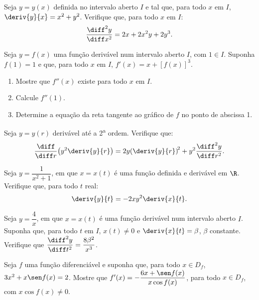 \begin{exercicio}[22]
\label{ex:7.11.22}
Seja $y = y(x)$ definida no intervalo aberto $I$ e tal que, para todo $x$ em $I$, $\deriv{y}{x} = x^2 + y^2$. Verifique que, para todo $x$ em $I$:
\[
\frac{\diff^2 y}{\diff x^2} = 2x + 2x^2 y + 2y^3.
\]
\end{exercicio}

\begin{exercicio}[23]
\label{ex:7.11.23}
Seja $y = f(x)$ uma função derivável num intervalo aberto $I$, com $1 \in I$. Suponha $f(1) = 1$ e que, para todo $x$ em $I$, $f'(x) = x + [f(x)]^3$.
\begin{enumerate}[label=\alph*)]
    \item Mostre que $f''(x)$ existe para todo $x$ em $I$.
    \item Calcule $f''(1)$.
    \item Determine a equação da reta tangente ao gráfico de $f$ no ponto de abscissa 1.
\end{enumerate}
\end{exercicio}

\begin{exercicio}[24]
\label{ex:7.11.24}
Seja $y = y(r)$ derivável até a 2\textsuperscript{a} ordem. Verifique que:
\[
\frac{\diff}{\diff r}\!\left(y^2 \deriv{y}{r}\right) = 2y\!\left(\deriv{y}{r}\right)^{\!2} + y^2 \frac{\diff^2 y}{\diff r^2}.
\]
\end{exercicio}

\begin{exercicio}[25]
\label{ex:7.11.25}
Seja $y = \dfrac{1}{x^2 + 1}$, em que $x = x(t)$ é uma função definida e derivável em $\R$. Verifique que, para todo $t$ real:
\[
\deriv{y}{t} = -2xy^2 \deriv{x}{t}.
\]
\end{exercicio}

\begin{exercicio}[26]
\label{ex:7.11.26}
Seja $y = \dfrac{4}{x}$, em que $x = x(t)$ é uma função derivável num intervalo aberto $I$. Suponha que, para todo $t$ em $I$, $x(t) \neq 0$ e $\deriv{x}{t} = \beta$, $\beta$ constante. Verifique que $\dfrac{\diff^2 y}{\diff t^2} = \dfrac{8\beta^2}{x^3}$.
\end{exercicio}

\begin{exercicio}[27]
\label{ex:7.11.27}
Seja $f$ uma função diferenciável e suponha que, para todo $x \in D_f$, $3x^2 + x\sen f(x) = 2$. Mostre que $f'(x) = -\dfrac{6x + \sen f(x)}{x\cos f(x)}$, para todo $x \in D_f$, com $x\cos f(x) \neq 0$.
\end{exercicio}

